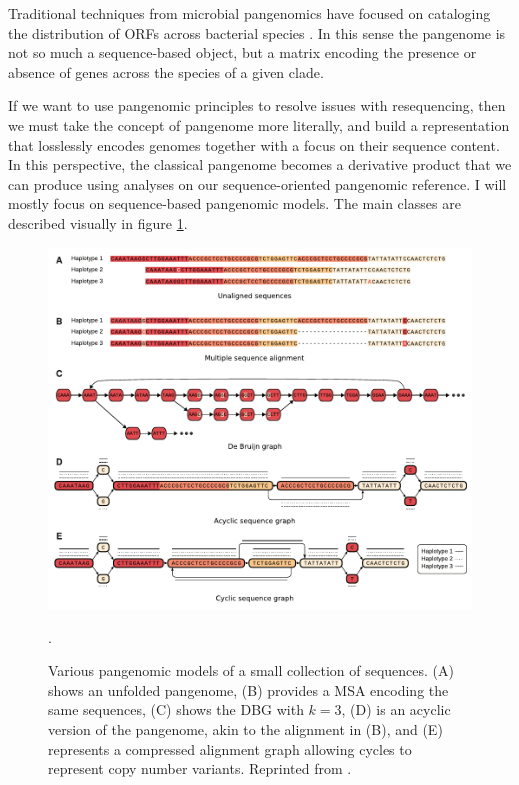 Traditional techniques from microbial pangenomics have focused on cataloging the distribution of ORFs across bacterial species \cite{page2015roary}.
In this sense the pangenome is not so much a sequence-based object, but a matrix encoding the presence or absence of genes across the species of a given clade.

If we want to use pangenomic principles to resolve issues with resequencing, then we must take the concept of pangenome more literally, and build a representation that losslessly encodes genomes together with a focus on their sequence content.
In this perspective, the classical pangenome becomes a derivative product that we can produce using analyses on our sequence-oriented pangenomic reference.
I will mostly focus on sequence-based pangenomic models.
The main classes are described visually in figure \ref{fig:pangenomic_models}.

\begin{figure}[htbp!]
  \centering
  \includegraphics[width=1.0\textwidth]{Chapter1/Figs/cpang_fig3.pdf}
  \caption[Pangenomic models]{
    Various pangenomic models of a small collection of sequences.
    (A) shows an unfolded pangenome,
    (B) provides a MSA encoding the same sequences,
    (C) shows the DBG with $k=3$,
    (D) is an acyclic version of the pangenome, akin to the alignment in (B),
    and (E) represents a compressed alignment graph allowing cycles to represent copy number variants. 
    Reprinted from \cite{computational2016computational}.
    }
  \label{fig:pangenomic_models}.
\end{figure}

